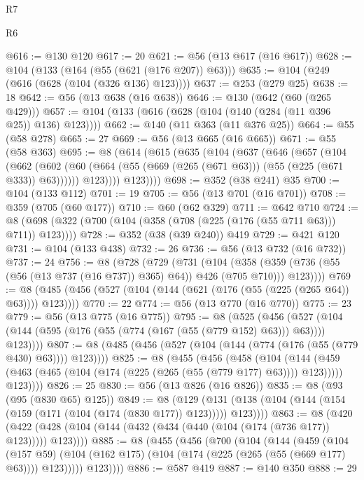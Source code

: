 \begin{lexlean}{R7}
\begin{lexlean}{R6}
\begin{coremodule}
{{{{{{{{{{{{{{{{{{{{@616 := @130 @120
@617 := 20
@621 := @56 (@13 @617 (@16 @617))
@628 := @104 (@133 (@164 (@55 (@621 (@176 @207)) @63)))
@635 := @104 (@249 (@616 (@628 (@104 (@326 @136) @123))))
@637 := @253 (@279 @25)
@638 := 18
@642 := @56 (@13 @638 (@16 @638))
@646 := @130 (@642 (@60 (@265 @429)))
@657 := @104 (@133 (@616 (@628 (@104 (@140 (@284 (@11 @396 @25)) @136) @123))))
@662 := @140 (@11 @363 (@11 @376 @25))
@664 := @55 (@58 @278)
@665 := 27
@669 := @56 (@13 @665 (@16 @665))
@671 := @55 (@58 @363)
@695 := @8
    (@614
      (@615
        (@635
          (@104
            (@637
              (@646
                (@657
                  (@104
                    (@662
                      (@602
                        (@60 (@664 (@55 (@669 (@265 (@671 @63))) (@55 (@225 (@671 @333)) @63))))))
                    @123))))
            @123))))
@698 := @352 (@38 @241) @35
@700 := @104 (@133 @112)
@701 := 19
@705 := @56 (@13 @701 (@16 @701))
@708 := @359 (@705 (@60 @177))
@710 := @60 (@62 @329)
@711 := @642 @710
@724 := @8 (@698 (@322 (@700 (@104 (@358 (@708 (@225 (@176 (@55 @711 @63))) @711)) @123))))
@728 := @352 (@38 (@39 @240)) @419
@729 := @421 @120
@731 := @104 (@133 @438)
@732 := 26
@736 := @56 (@13 @732 (@16 @732))
@737 := 24
@756 := @8
    (@728
      (@729
        (@731
          (@104
            (@358 (@359 (@736 (@55 (@56 (@13 @737 (@16 @737)) @365) @64)) @426 (@705 @710)))
            @123))))
@769 := @8 (@485 (@456 (@527 (@104 (@144 (@621 (@176 (@55 (@225 (@265 @64)) @63)))) @123))))
@770 := 22
@774 := @56 (@13 @770 (@16 @770))
@775 := 23
@779 := @56 (@13 @775 (@16 @775))
@795 := @8
    (@525
      (@456 (@527 (@104 (@144 (@595 (@176 (@55 (@774 (@167 (@55 (@779 @152) @63))) @63)))) @123))))
@807 := @8 (@485 (@456 (@527 (@104 (@144 (@774 (@176 (@55 (@779 @430) @63)))) @123))))
@825 := @8
    (@455
      (@456
        (@458
          (@104
            (@144 (@459 (@463 (@465 (@104 (@174 (@225 (@265 (@55 (@779 @177) @63)))) @123)))))
            @123))))
@826 := 25
@830 := @56 (@13 @826 (@16 @826))
@835 := @8 (@93 (@95 (@830 @65) @125))
@849 := @8
    (@129 (@131 (@138 (@104 (@144 (@154 (@159 (@171 (@104 (@174 (@830 @177)) @123))))) @123))))
@863 := @8
    (@420 (@422 (@428 (@104 (@144 (@432 (@434 (@440 (@104 (@174 (@736 @177)) @123))))) @123))))
@885 := @8
    (@455
      (@456
        (@700
          (@104
            (@144
              (@459
                (@104
                  (@157 @59)
                  (@104 (@162 @175) (@104 (@174 (@225 (@265 (@55 (@669 @177) @63)))) @123)))))
            @123))))
@886 := @587 @419
@887 := @140 @350
@888 := 29
}}}}}}}}}}}}}}}}}}}}
\end{coremodule}
\end{lexlean}
\end{lexlean}
